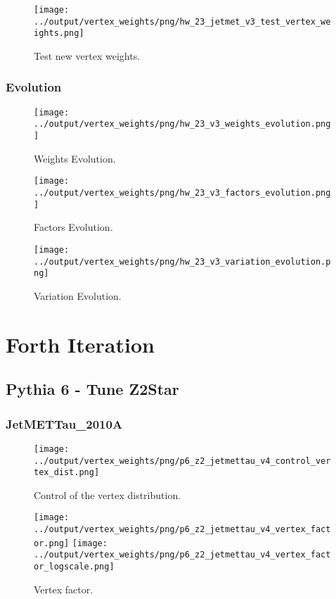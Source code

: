 \documentclass[11pt]{book}
\begin{document}
\begin{figure}[ht]
\centering
\texttt{[image: ../output/vertex\_weights/png/hw\_23\_jetmet\_v3\_test\_vertex\_weights.png]}
\caption{Test new vertex weights.}
\end{figure}
\clearpage

\subsection{Evolution}
\begin{figure}[ht]
\centering
\texttt{[image: ../output/vertex\_weights/png/hw\_23\_v3\_weights\_evolution.png]}
\caption{Weights Evolution.}
\end{figure}


\begin{figure}[ht]
\centering
\texttt{[image: ../output/vertex\_weights/png/hw\_23\_v3\_factors\_evolution.png]}
\caption{Factors Evolution.}
\end{figure}

\begin{figure}[ht]
\centering
\texttt{[image: ../output/vertex\_weights/png/hw\_23\_v3\_variation\_evolution.png]}
\caption{Variation Evolution.}
\end{figure}
\clearpage

\chapter{Forth Iteration}
\section{Pythia 6 - Tune Z2Star}
\subsection{JetMETTau\_2010A}
\begin{figure}[ht]
\centering
\texttt{[image: ../output/vertex\_weights/png/p6\_z2\_jetmettau\_v4\_control\_vertex\_dist.png]}
\caption{Control of the vertex distribution.}
\end{figure}

\begin{figure}[ht]
\centering
\texttt{[image: ../output/vertex\_weights/png/p6\_z2\_jetmettau\_v4\_vertex\_factor.png]}
\texttt{[image: ../output/vertex\_weights/png/p6\_z2\_jetmettau\_v4\_vertex\_factor\_logscale.png]}
\caption{Vertex factor.}
\end{figure}
\end{document}
